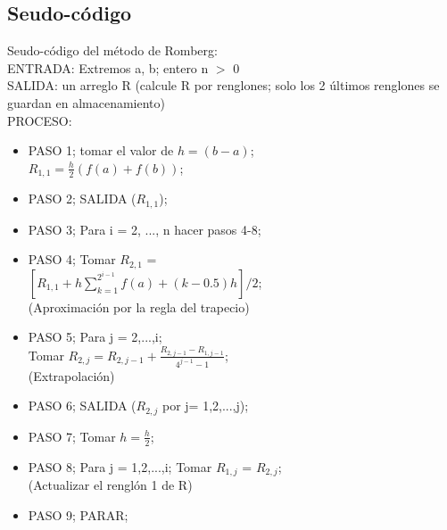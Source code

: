 \documentclass[journal,transmag]{IEEEtran}
\theoremstyle{mytheoremstyle}
\theoremstyle{mytheoremstyle}
\theoremstyle{myproblemstyle}
\begin{document}
\subsection{Seudo-código}
        Seudo-código del método de Romberg: \cite{in_mr} \\

        ENTRADA: Extremos a, b; entero n $>$ 0 \\
        SALIDA: un arreglo R (calcule R por renglones; solo los 2 últimos renglones
        se guardan en almacenamiento) \\
        PROCESO: \\
        \begin{itemize}
            \item   PASO 1; tomar el valor de $h=(b-a)$; \\
                        $R_{1,1} = \frac{h}{2} (f(a)+f(b))$; \\
            \item   PASO 2; SALIDA ($R_{1,1}$); \\
            \item   PASO 3; Para i = 2, ..., n hacer pasos 4-8; \\
            \item   PASO 4; Tomar $R_{2,1}$ = \\
            $[R_{1,1} + h\displaystyle\sum_{k=1}^{2^{i-1}} f(a)+(k-0.5)h]/2$; \\
            (Aproximación por la regla del trapecio) \\
            \item   PASO 5; Para j = 2,...,i; \\
                    Tomar $R_{2,j} = R_{2,j-1}+\frac{R_{2,j-1}-R_{1,j-1}}{4^{j-1}-1}$; \\
                    (Extrapolación) \\
            \item   PASO 6; SALIDA ($R_{2,j}$ por j= 1,2,...,j); \\
            \item   PASO 7; Tomar $h = \frac{h}{2}$; \\
            \item   PASO 8; Para j = 1,2,...,i; Tomar $R_{1,j}$ = $R_{2,j}$; \\
                    (Actualizar el renglón 1 de R) \\
            \item   PASO 9; PARAR;\\
        \end{itemize}
\end{document}
